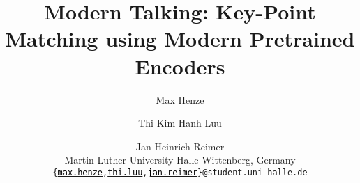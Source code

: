 \documentclass[11pt]{article}
\title{Modern Talking: Key-Point Matching using Modern Pretrained Encoders}
\author{%
  Max Henze \and Thi Kim Hanh Luu \and Jan Heinrich Reimer \\
  Martin Luther University Halle-Wittenberg, Germany \\ 
  \texttt{\{\href{mailto:max.henze@student.uni-halle.de}{\textcolor{black}{max.henze}},\href{mailto:thi.luu@student.uni-halle.de}{\textcolor{black}{thi.luu}},\href{mailto:jan.reimer@student.uni-halle.de}{\textcolor{black}{jan.reimer}}\}@student.uni-halle.de}%
}
\begin{document}
\maketitle

\begin{abstract}
  
\end{abstract}











\appendix


\end{document}
